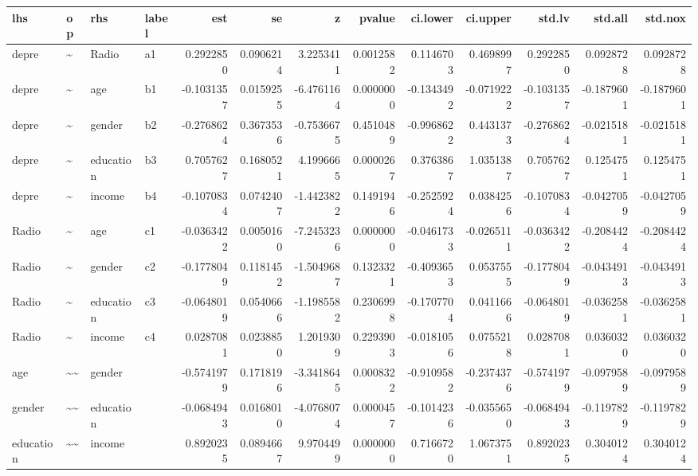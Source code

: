\documentclass[
]{article}
\begin{document}
\begin{table}[!h]
\centering
\begin{tabular}[t]{llllrrrrrrrrr}
\toprule
lhs & op & rhs & label & est & se & z & pvalue & ci.lower & ci.upper & std.lv & std.all & std.nox\\
\midrule
depre & \textasciitilde{} & Radio & a1 & 0.2922850 & 0.0906214 & 3.2253411 & 0.0012582 & 0.1146703 & 0.4698997 & 0.2922850 & 0.0928728 & 0.0928728\\
depre & \textasciitilde{} & age & b1 & -0.1031357 & 0.0159255 & -6.4761164 & 0.0000000 & -0.1343492 & -0.0719222 & -0.1031357 & -0.1879601 & -0.1879601\\
depre & \textasciitilde{} & gender & b2 & -0.2768624 & 0.3673536 & -0.7536675 & 0.4510489 & -0.9968622 & 0.4431373 & -0.2768624 & -0.0215181 & -0.0215181\\
depre & \textasciitilde{} & education & b3 & 0.7057627 & 0.1680521 & 4.1996665 & 0.0000267 & 0.3763867 & 1.0351387 & 0.7057627 & 0.1254751 & 0.1254751\\
depre & \textasciitilde{} & income & b4 & -0.1070834 & 0.0742407 & -1.4423822 & 0.1491946 & -0.2525924 & 0.0384256 & -0.1070834 & -0.0427059 & -0.0427059\\
\addlinespace
Radio & \textasciitilde{} & age & c1 & -0.0363422 & 0.0050160 & -7.2453236 & 0.0000000 & -0.0461733 & -0.0265111 & -0.0363422 & -0.2084424 & -0.2084424\\
Radio & \textasciitilde{} & gender & c2 & -0.1778049 & 0.1181452 & -1.5049687 & 0.1323321 & -0.4093653 & 0.0537555 & -0.1778049 & -0.0434913 & -0.0434913\\
Radio & \textasciitilde{} & education & c3 & -0.0648019 & 0.0540666 & -1.1985582 & 0.2306998 & -0.1707704 & 0.0411666 & -0.0648019 & -0.0362581 & -0.0362581\\
Radio & \textasciitilde{} & income & c4 & 0.0287081 & 0.0238850 & 1.2019309 & 0.2293903 & -0.0181056 & 0.0755218 & 0.0287081 & 0.0360320 & 0.0360320\\
age & \textasciitilde{}\textasciitilde{} & gender &  & -0.5741979 & 0.1718196 & -3.3418645 & 0.0008322 & -0.9109582 & -0.2374376 & -0.5741979 & -0.0979589 & -0.0979589\\
\addlinespace
gender & \textasciitilde{}\textasciitilde{} & education &  & -0.0684943 & 0.0168010 & -4.0768074 & 0.0000457 & -0.1014236 & -0.0355650 & -0.0684943 & -0.1197829 & -0.1197829\\
education & \textasciitilde{}\textasciitilde{} & income &  & 0.8920235 & 0.0894667 & 9.9704499 & 0.0000000 & 0.7166720 & 1.0673751 & 0.8920235 & 0.3040124 & 0.3040124\\

\end{tabular}
\end{table}
\end{document}
